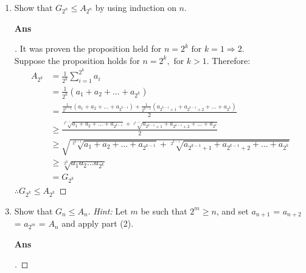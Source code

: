 \documentclass[paper=usletter, fontsize=12pt]{article}
\begin{document}
\begin{itemize}
\begin{itemize}
\begin{enumerate}
                \item Show that $G_{2^n} \le A_{2^n}$ by using induction on
                $n$.
                \item[\textbf{Ans}]
                \begin{proof}[\unskip\nopunct]
                    It was proven the proposition held for $n = 2^k \text{ for
                    \ } k = 1 \Rightarrow 2$. \\
                    Suppose the proposition holds for $n = 2^k, \text{ for \ }
                    k > 1$. Therefore:
                    \begin{align*}
                        A_{2^k} & = \frac{1}{2^k}\sum_{i=1}^{2^k}a_i \\
                        & = \frac{1}{2^k}(a_1 + a_2 + \ldots + a_{2^k}) \\
                        & = \frac{\frac{1}{2^{k-1}}(a_1 + a_2 + \ldots +
                        a_{2^{k-1}}) + \frac{1}{2^{k-1}}(a_{2^{k-1}+1} +
                        a_{2^{k-1}+2} + \ldots + a_{2^k})}{2} \\
                        & \ge \frac{\sqrt[2^{k-1}]{a_1 + a_2 + \ldots +
                        a_{2^{k-1}}} + \sqrt[2^{k-1}]{a_{2^{k-1}+1} +
                        a_{2^{k-1}+2} + \ldots + a_{2^k}}}{2} \\
                        & \ge \sqrt{\sqrt[2^{k-1}]{a_1 + a_2 + \ldots +
                        a_{2^{k-1}}} + \sqrt[2^{k-1}]{a_{2^{k-1}+1} +
                        a_{2^{k-1}+2} + \ldots + a_{2^k}}} \\
                        & \ge \sqrt[2^k]{a_{1}a_{2}\ldots a_{2^k}} \\
                        & = G_{2^k}
                    \end{align*}
                    $\therefore G_{2^k} \le A_{2^k}$ \qedhere
                \end{proof}
                \vspace{0.2in}

                \item Show that $G_n \le A_n$.
                \textit{Hint:} Let $m$ be such that $2^m \ge n$, and set
                $a_{n+1}$ = $a_{n+2}$ = $a_{2^m}$ = $A_n$ and apply part (2).

                \item[\textbf{Ans}]
                \begin{proof}[\unskip\nopunct]
                \end{proof}
                \vspace{0.2in}


\end{enumerate}
\end{itemize}
\end{itemize}
\end{document}
